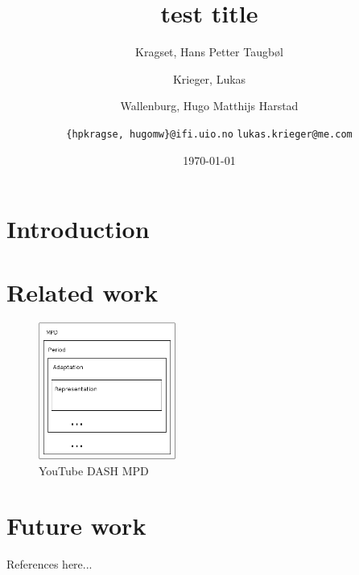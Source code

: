 \documentclass[10pt,journal]{IEEEtran}
\title{test title}
\author{
	Kragset, Hans Petter Taugb\o l
	\and
	Krieger, Lukas
	\and
	Wallenburg, Hugo Matthijs Harstad
	\and
	\newline
	\texttt{\{hpkragse, hugomw\}@ifi.uio.no}
	\texttt{lukas.krieger@me.com}
}
\date{\today}
\begin{document}
\maketitle

\begin{abstract}
	\lipsum[1]
\end{abstract}

\section{Introduction}


\section{Related work}
\lipsum[1-15]



\begin{figure}
	\centering
	\includegraphics[width=0.4\textwidth]{figures/yt-dash.png}
	\caption{YouTube DASH MPD}
\end{figure}







\section{Future work}

\lipsum[1-4]



\lipsum[1-4]

References here...
\end{document}
